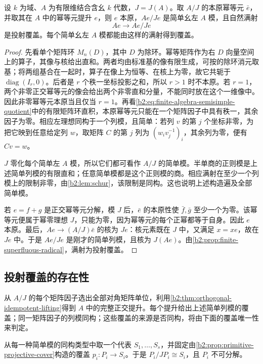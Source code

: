 \begin{proposition}\label{b2:prop:primitive-projective-cover}
	设 \(k\) 为域、\(A\) 为有限维结合含幺 \(k\) 代数，\(J=J(A)\)。取 \(A/J\) 的本原幂等元 \(\bar e\)，并取其在 \(A\) 中的幂等元提升 \(e\)，则 \(e\) 本原，\(Ae/Je\) 是简单幺左 \(A\) 模，且自然满射
	\[
		Ae\longrightarrow Ae/Je
	\]
	是投射覆盖。每个简单幺左 \(A\) 模都能由这样的满射得到覆盖。
\end{proposition}
\begin{proof}
	先看单个矩阵环 \(M_n(D)\)，其中 \(D\) 为除环。幂等矩阵作为右 \(D\) 向量空间上的算子，其像与核给出直和。两者均由标准基的像有限生成，可按的除环消元取基；将两组基合在一起时，算子在像上为恒等、在核上为零，故它共轭于 \(\operatorname{diag}(I_r,0)\)。后者是 \(r\) 个秩一坐标投影之和，所以 \(r>1\) 时不本原。若 \(r=1\)，两个非零正交幂等元的像会给出两个非零直和分量，不能同时放在这个一维像中。因此非零幂等元本原当且仅当 \(r=1\)。再看\eqref{b2:eq:finite-algebra-semisimple-quotient}中的有限矩阵环直积，本原幂等元只能在一个矩阵因子中具有秩一，其余因子为零。相应左理想同构于一个列模，且简单：若列 \(v\) 的第 \(j\) 个坐标非零，为把它映到任意给定列 \(w\)，取矩阵 \(C\) 的第 \(j\) 列为 \((w_iv_j^{-1})_i\)，其余列为零，便有 \(Cv=w\)。

	\(J\) 零化每个简单左 \(A\) 模，所以它们都可看作 \(A/J\) 的简单模。半单商的正则模是上述简单列模的有限直和；任意简单模都是这个正则模的商。相应满射在至少一个列模上的限制非零，由\cref{b2:lem:schur}，该限制是同构。这也说明上述构造遍及全部简单模。

	若 \(e=f+g\) 是正交幂等元分解，模 \(J\) 后，\(\bar e\) 的本原性使 \(\bar f,\bar g\) 至少一个为零。该幂等元便属于幂零理想 \(J\)，只能为零，因为幂等元的每个正幂都等于自身。因此 \(e\) 本原。最后，\(Ae\to(A/J)\bar e\) 的核为 \(Je\)：核元素既在 \(J\) 中，又满足 \(x=xe\)，故在 \(Je\) 中。于是 \(Ae/Je\) 是刚才的简单列模，且核为 \(J(Ae)\)。由\cref{b2:prop:finite-superfluous-radical}，满射为投射覆盖。
\end{proof}

\subsection{投射覆盖的存在性}
\label{b2:subsec:1503:04}

从 \(A/J\) 的每个矩阵因子选出全部对角矩阵单位，利用\cref{b2:thm:orthogonal-idempotent-lifting}得到 \(A\) 中的完整正交提升。每个提升给出上述简单列模的覆盖；同一矩阵因子的列模同构；这些覆盖的来源是否同构，将由下面的覆盖唯一性来判定。

\ProseParagraphBreak
从每一种简单模的同构类型中取一个代表 \(S_1,\ldots,S_s\)，并固定由\cref{b2:prop:primitive-projective-cover}构造的覆盖 \(p_i:P_i\to S_i\)。于是 \(P_i/JP_i\cong S_i\)，且 \(P_i\) 不可分解。

